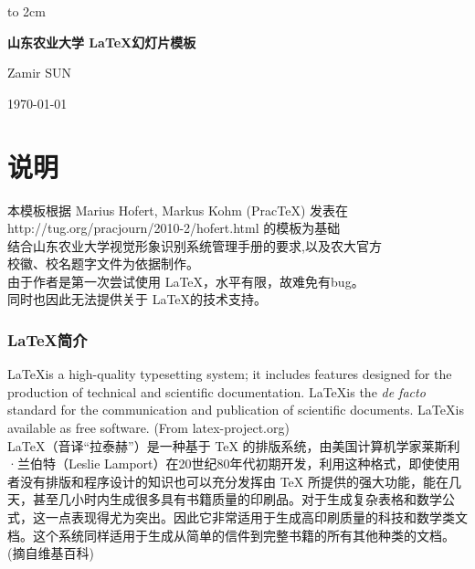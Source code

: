 \documentclass[
	paper=128mm:96mm,	%
	fontsize=11pt,					%
	pagesize,							%
	parskip=half-,					%
	numbers=noendperiod,	%
	captions=nooneline			%
	]{scrartcl}							%
\newcommand*{\mytitleontitlepage}{山东农业大学 \LaTeX 幻灯片模板}	%
\newcommand*{\myauthor}{Zamir SUN}				%
\newcommand*{\mydate}{\today}						%
\theoremstyle{mythmstyle}
\begin{document}
\begin{CJK*}{UTF8}{gbsn}
%
%
\thispagestyle{empty}
\vbox to 2cm{}
\begin{center}
	\vspace{0.6cm}

	\color{white}\sffamily
	{\bfseries\Large\mytitleontitlepage\par}
   \vspace{0.5cm}
	\normalsize
   \myauthor\par
   \mydate\par
	\vfill
\end{center}
\clearpage
\ClearWallPaper
{}
%
%
\tableofcontents
\clearpage
%
%
\section{说明}
本模板根据 Marius Hofert, Markus Kohm (PracTeX) 发表在\\
http://tug.org/pracjourn/2010-2/hofert.html 的模板为基础\\
结合山东农业大学视觉形象识别系统管理手册的要求,以及农大官方\\
校徽、校名题字文件为依据制作。\\
由于作者是第一次尝试使用 \LaTeX，水平有限，故难免有bug。\\
同时也因此无法提供关于 \LaTeX 的技术支持。
\clearpage
%
%
\subsubsection*{\LaTeX 简介}
	\LaTeX is a high-quality typesetting system; it includes features designed for the production of technical and scientific documentation. \LaTeX is the \textit{de facto} standard for the communication and publication of scientific documents. \LaTeX is available as free software. (From latex-project.org)\\
\LaTeX（音译“拉泰赫”）是一种基于 \TeX{} 的排版系统，由美国计算机学家莱斯利·兰伯特（Leslie Lamport）在20世纪80年代初期开发，利用这种格式，即使使用者没有排版和程序设计的知识也可以充分发挥由 \TeX{} 所提供的强大功能，能在几天，甚至几小时内生成很多具有书籍质量的印刷品。对于生成复杂表格和数学公式，这一点表现得尤为突出。因此它非常适用于生成高印刷质量的科技和数学类文档。这个系统同样适用于生成从简单的信件到完整书籍的所有其他种类的文档。 (摘自维基百科)


\end{CJK*}
\end{document}
